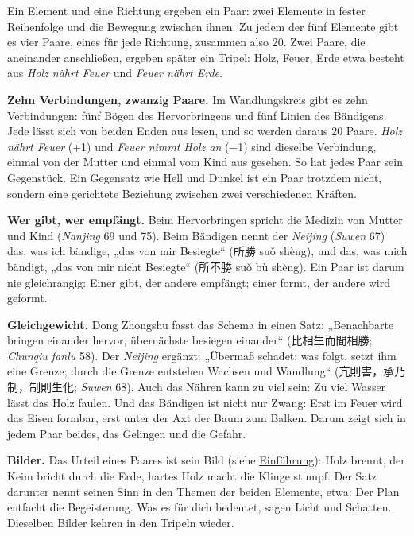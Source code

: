 \documentclass[12pt,paper=a5,DIV=13,headings=small,twoside=true,open=any]{scrbook}
\newlength{\normalparindent}
\newenvironment{einleitung}
  {\par\justifying\setlength{\parindent}{\normalparindent}\setlength{\parskip}{0pt}}
  {\par}
\DeclareRobustCommand\verzkapitel[1]{\par\addvspace{1.6ex}\noindent\textbf{#1}\par\nobreak\vspace{0.4ex}}
\newcommand\verzkap[1]{\addtocontents{ver}{\protect\verzkapitel{#1}}}
\begin{document}
\label{kap:paare}\verzkap{Die 20 Paare}

\begin{einleitung}
Ein Element und eine Richtung ergeben ein Paar: zwei Elemente in fester Reihenfolge und die Bewegung zwischen ihnen. Zu jedem der fünf Elemente gibt es vier Paare, eines für jede Richtung, zusammen also 20. Zwei Paare, die aneinander anschließen, ergeben später ein Tripel: Holz, Feuer, Erde etwa besteht aus \textit{Holz nährt Feuer} und \textit{Feuer nährt Erde}.

\textbf{Zehn Verbindungen, zwanzig Paare.} Im Wandlungskreis gibt es zehn Verbindungen: fünf Bögen des Hervorbringens und fünf Linien des Bändigens. Jede lässt sich von beiden Enden aus lesen, und so werden daraus 20 Paare. \textit{Holz nährt Feuer} (+1) und \textit{Feuer nimmt Holz an} (−1) sind dieselbe Verbindung, einmal von der Mutter und einmal vom Kind aus gesehen. So hat jedes Paar sein Gegenstück. Ein Gegensatz wie Hell und Dunkel ist ein Paar trotzdem nicht, sondern eine gerichtete Beziehung zwischen zwei verschiedenen Kräften.

\textbf{Wer gibt, wer empfängt.} Beim Hervorbringen spricht die Medizin von Mutter und Kind (\textit{Nanjing} 69 und 75). Beim Bändigen nennt der \textit{Neijing} (\textit{Suwen} 67) das, was ich bändige, „das von mir Besiegte“ ({\cjk 所勝} suǒ shèng), und das, was mich bändigt, „das von mir nicht Besiegte“ ({\cjk 所不勝} suǒ bù shèng). Ein Paar ist darum nie gleichrangig: Einer gibt, der andere empfängt; einer formt, der andere wird geformt.

\textbf{Gleichgewicht.} Dong Zhongshu fasst das Schema in einen Satz: „Benachbarte bringen einander hervor, übernächste besiegen einander“ ({\cjk 比相生而間相勝}; \textit{Chunqiu fanlu} 58). Der \textit{Neijing} ergänzt: „Übermaß schadet; was folgt, setzt ihm eine Grenze; durch die Grenze entstehen Wachsen und Wandlung“ ({\cjk 亢則害，承乃制，制則生化}; \textit{Suwen} 68). Auch das Nähren kann zu viel sein: Zu viel Wasser lässt das Holz faulen. Und das Bändigen ist nicht nur Zwang: Erst im Feuer wird das Eisen formbar, erst unter der Axt der Baum zum Balken. Darum zeigt sich in jedem Paar beides, das Gelingen und die Gefahr.

\textbf{Bilder.} Das Urteil eines Paares ist sein Bild (siehe \hyperref[kap:einfuehrung]{Einführung}): Holz brennt, der Keim bricht durch die Erde, hartes Holz macht die Klinge stumpf. Der Satz darunter nennt seinen Sinn in den Themen der beiden Elemente, etwa: Der Plan entfacht die Begeisterung. Was es für dich bedeutet, sagen Licht und Schatten. Dieselben Bilder kehren in den Tripeln wieder.


\end{einleitung}
\end{document}
